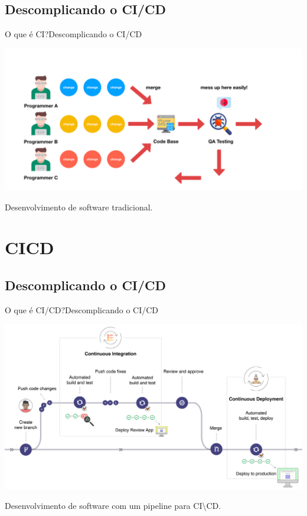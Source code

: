 \documentclass[10pt]{beamer}
\begin{document}
\subsection{Descomplicando o CI/CD}
\begin{frame}{O que é CI?}{Descomplicando o CI/CD}
  \begin{center}
    \includegraphics[scale=0.25]{images/traditional.png}
  \end{center}
  \begin{center}
      Desenvolvimento de software tradicional.
   \end{center}
\end{frame}

\section{CICD}
\subsection{Descomplicando o CI/CD}
\begin{frame}{O que é CI/CD?}{Descomplicando o CI/CD}
  \begin{center}
    \includegraphics[scale=0.09]{images/workflow.png}
  \end{center}
  \begin{center}
      Desenvolvimento de software com um pipeline para CI\textbackslash CD.
   \end{center}
\end{frame}
\end{document}

